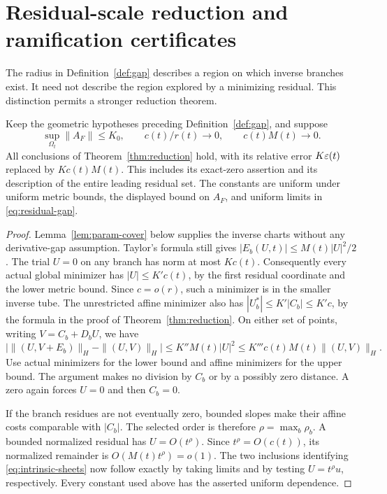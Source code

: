 \section{Residual-scale reduction and ramification certificates}\label{sec:residual-scale}
The radius in Definition~\ref{def:gap} describes a region on which inverse
branches exist. It need not describe the region explored by a minimizing
residual. This distinction permits a stronger reduction theorem.

\begin{theorem}\label{thm:residual-scale}
Keep the geometric hypotheses preceding Definition~\ref{def:gap}, and suppose
\begin{equation}\label{eq:residual-gap}
 \sup_{\Omega_t}\|A_F\|\le K_0,\qquad
 c(t)/r(t)\longrightarrow0,\qquad c(t)M(t)\longrightarrow0.
\end{equation}
All conclusions of Theorem~\ref{thm:reduction} hold, with its relative error
$K\varepsilon(t)$ replaced by $Kc(t)M(t)$. This includes its exact-zero assertion and
its description of the entire leading residual set. The constants are uniform
under uniform metric bounds, the displayed bound on $A_F$, and uniform limits
in \eqref{eq:residual-gap}.
\end{theorem}
\begin{proof}
Lemma~\ref{lem:param-cover} below supplies the inverse charts without any
derivative-gap assumption. Taylor's formula still gives
$|E_b(U,t)|\le M(t)|U|^2/2$. The trial $U=0$ on any branch has norm at most
$Kc(t)$. Consequently every actual global minimizer has $|U|\le K'c(t)$,
by the first residual coordinate and the lower metric bound. Since $c=o(r)$,
such a minimizer is in the smaller inverse tube. The unrestricted affine
minimizer also has $|U_b^*|\le K'|C_b|\le K'c$, by the formula in the proof
of Theorem~\ref{thm:reduction}. On either set of points, writing
$V=C_b+D_bU$, we have
\[
 \big|\|(U,V+E_b)\|_H-\|(U,V)\|_H\big|
 \le K''M(t)|U|^2\le K'''c(t)M(t)\|(U,V)\|_H.
\]
Use actual minimizers for the lower bound and affine minimizers for the upper
bound. The argument makes no division by $C_b$ or by a possibly zero distance.
A zero again forces $U=0$ and then $C_b=0$.

If the branch residues are not eventually zero, bounded slopes make their
affine costs comparable with $|C_b|$. The selected order is therefore
$\rho=\max_b\rho_b$. A bounded normalized residual has $U=O(t^\rho)$.
Since $t^\rho=O(c(t))$, its normalized remainder is
$O(M(t)t^\rho)=o(1)$. The two inclusions identifying
\eqref{eq:intrinsic-sheets} now follow exactly by taking limits and by testing
$U=t^\rho u$, respectively. Every constant used above has the asserted
uniform dependence.
\end{proof}

